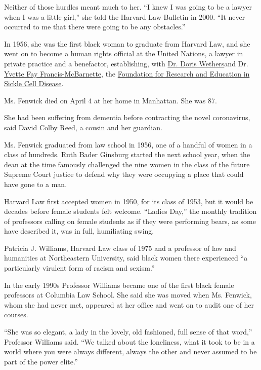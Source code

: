 Neither of those hurdles meant much to her. ``I knew I was going to be a
lawyer when I was a little girl,'' she told the Harvard Law Bulletin in
2000. ``It never occurred to me that there were going to be any
obstacles.''

In 1956, she was the first black woman to graduate from Harvard Law, and
she went on to become a human rights official at the United Nations, a
lawyer in private practice and a benefactor, establishing, with
\href{https://www.nytimes3xbfgragh.onion/2019/02/07/obituaries/dr-doris-wethers-on-front-lines-against-sickle-cell-dies-at-91.html}{Dr.
Doris Wethers}and Dr.
\href{https://www.nytimes3xbfgragh.onion/2016/04/08/nyregion/yvette-fay-francis-mcbarnette-a-pioneer-in-treating-sickle-cell-anemia-dies-at-89.html}{Yvette
Fay Francis-McBarnette}, the
\href{https://www.ncbi.nlm.nih.gov/pmc/articles/PMC2611822/}{Foundation
for Research and Education in Sickle Cell Disease}.

Ms. Fenwick died on April 4 at her home in Manhattan. She was 87.

She had been suffering from dementia before contracting the novel
coronavirus, said David Colby Reed, a cousin and her guardian.

Ms. Fenwick graduated from law school in 1956, one of a handful of women
in a class of hundreds. Ruth Bader Ginsburg started the next school
year, when the dean at the time famously challenged the nine women in
the class of the future Supreme Court justice to defend why they were
occupying a place that could have gone to a man.

Harvard Law first accepted women in 1950, for its class of 1953, but it
would be decades before female students felt welcome. ``Ladies Day,''
the monthly tradition of professors calling on female students as if
they were performing bears, as some have described it, was in full,
humiliating swing.

Patricia J. Williams, Harvard Law class of 1975 and a professor of law
and humanities at Northeastern University, said black women there
experienced ``a particularly virulent form of racism and sexism.''

In the early 1990s Professor Williams became one of the first black
female professors at Columbia Law School. She said she was moved when
Ms. Fenwick, whom she had never met, appeared at her office and went on
to audit one of her courses.

``She was so elegant, a lady in the lovely, old fashioned, full sense of
that word,'' Professor Williams said. ``We talked about the loneliness,
what it took to be in a world where you were always different, always
the other and never assumed to be part of the power elite.''

